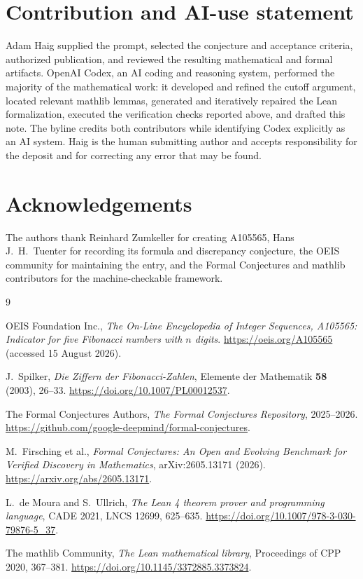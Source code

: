 \documentclass[11pt]{article}
\begin{document}
\section*{Contribution and AI-use statement}

Adam Haig supplied the prompt, selected the conjecture and acceptance criteria,
authorized publication, and reviewed the resulting mathematical and formal
artifacts.  OpenAI Codex, an AI coding and reasoning system, performed the
majority of the mathematical work: it developed and refined the cutoff
argument, located relevant mathlib lemmas, generated and iteratively repaired
the Lean formalization, executed the verification checks reported above, and
drafted this note.  The byline credits both contributors while identifying
Codex explicitly as an AI system.  Haig is the human submitting author and
accepts responsibility for the deposit and for correcting any error that may
be found.

\section*{Acknowledgements}

The authors thank Reinhard Zumkeller for creating A105565, Hans J.~H.~Tuenter
for recording its formula and discrepancy conjecture, the OEIS community for
maintaining the entry, and the Formal Conjectures and mathlib contributors for
the machine-checkable framework.

\begin{thebibliography}{9}

OEIS Foundation Inc.,
\emph{The On-Line Encyclopedia of Integer Sequences, A105565: Indicator for
five Fibonacci numbers with $n$ digits}.
\url{https://oeis.org/A105565} (accessed 15 August 2026).

J.~Spilker,
\emph{Die Ziffern der Fibonacci-Zahlen},
Elemente der Mathematik \textbf{58} (2003), 26--33.
\url{https://doi.org/10.1007/PL00012537}.

The Formal Conjectures Authors,
\emph{The Formal Conjectures Repository}, 2025--2026.
\url{https://github.com/google-deepmind/formal-conjectures}.

M.~Firsching et al.,
\emph{Formal Conjectures: An Open and Evolving Benchmark for Verified
Discovery in Mathematics}, arXiv:2605.13171 (2026).
\url{https://arxiv.org/abs/2605.13171}.

L.~de Moura and S.~Ullrich,
\emph{The Lean 4 theorem prover and programming language},
CADE 2021, LNCS 12699, 625--635.
\url{https://doi.org/10.1007/978-3-030-79876-5_37}.

The mathlib Community,
\emph{The Lean mathematical library},
Proceedings of CPP 2020, 367--381.
\url{https://doi.org/10.1145/3372885.3373824}.

\end{thebibliography}
\end{document}
